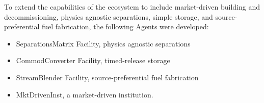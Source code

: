 
To extend the capabilities of the \Cyclus ecosystem to include market-driven 
building and decommissioning, physics agnostic separations, simple storage, and 
source-preferential fuel fabrication, the following Agents were developed:

\begin{itemize}
\item SeparationsMatrix Facility, physics agnostic separations
\item CommodConverter Facility, timed-release storage
\item StreamBlender Facility, source-preferential fuel fabrication 
\item MktDrivenInst, a market-driven institution.
\end{itemize}

